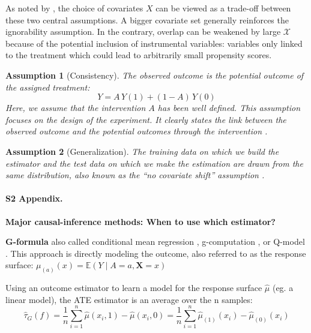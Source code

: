 \documentclass[10pt,letterpaper]{article}
\newtheorem{assumption}{Assumption}
\begin{document}
As noted by \cite{damour2020overlap}, the choice of covariates $X$ can
be viewed as a trade-off between these two central assumptions. A bigger
covariate set generally reinforces the ignorability assumption. In the
contrary, overlap can be weakened by large $\mathcal{X}$ because of the
potential inclusion of instrumental variables: variables only linked to the treatment which
could lead to arbitrarily small propensity scores.



\begin{assumption}[Consistency]\label{assumption:consistency} The observed
  outcome is the potential outcome of the assigned treatment:
  \begin{equation}\label{eq:consistancy}
    Y = A \, Y(1) + (1-A) \, Y(0)
  \end{equation}
  Here, we assume that the intervention $A$ has been well defined. This
  assumption focuses on the design of the experiment. It clearly states the link
  between the observed outcome and the potential outcomes through the
  intervention \cite{hernan2020causal}.
\end{assumption}

\begin{assumption}[Generalization]\label{assumption:generalization} The training
  data on which we build the estimator and the test data on which we make the
  estimation are drawn from the same distribution, also known as
  the ``no covariate shift'' assumption \cite{jesson2020identifying}.
\end{assumption}
\clearpage



\paragraph*{S2 Appendix.}
\label{apd:causal_estimators}
{\bf Major causal-inference methods: When to use which estimator?}


\textbf{G-formula} also called conditional mean regression
\cite{wendling2018comparing}, g-computation \cite{robins1986role}, or
Q-model \cite{snowden2011implementation}. This approach is directly modeling
the outcome, also referred to as the response surface: $\mu_{(a)}(x)
  =\mathbb{E}\left(Y \mid A=a, \mathbf{X}=x\right)$

Using an outcome estimator to learn a model for the response surface $\hat
  \mu$ (eg. a linear model), the ATE estimator is an average over the n samples:
\begin{equation}
  \hat{\tau}_G(f) = \frac{1}{n} \sum_{i=1}^n \hat \mu(x_i, 1) - \hat \mu(x_i, 0) = \frac{1}{n} \sum_{i=1}^n \hat \mu_{(1)}(x_i) - \hat \mu_{(0)}(x_i)
\end{equation}
\end{document}
